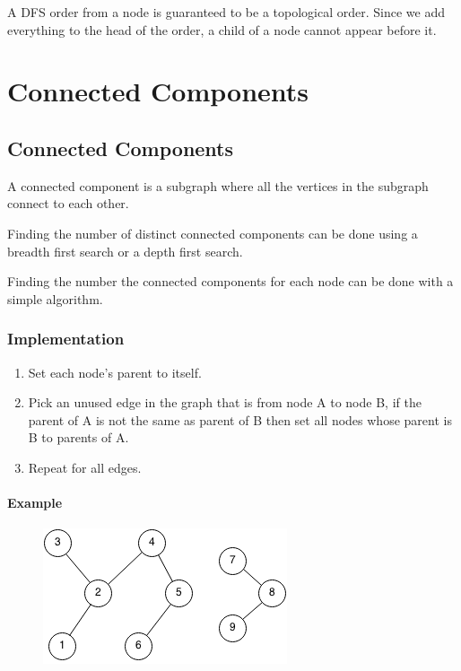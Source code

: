 \documentclass[11pt,oneside]{book}
\makeatletter
\def\maxwidth#1{\ifdim\Gin@nat@width>#1 #1\else\Gin@nat@width\fi}
\makeatother
\begin{document}
A DFS order from a node is guaranteed to be a topological order. Since we add everything to the head of the order, a child of a node cannot appear before it.

    \chapter{ Connected Components }
        \section{ Connected Components }
        

A connected component is a subgraph where all the vertices in the subgraph connect to each other.

Finding the number of distinct connected components can be done using a breadth first search or a depth first search.

Finding the number the connected components for each node can be done with a simple algorithm.

\subsection{Implementation}

\begin{enumerate}
\item Set each node's parent to itself.
\item Pick an unused edge in the graph that is from node A to node B, if the parent of A is not the same as parent of B then set all nodes whose parent is B to parents of A.
\item Repeat for all edges.
\end{enumerate}

\subsubsection{Example}

\vspace{5px}\begin{figure}[H]\centering
        \includegraphics[width=0.66\maxwidth{\textwidth}]{connectedcomponents.png}
        \end{figure}
\end{document}
